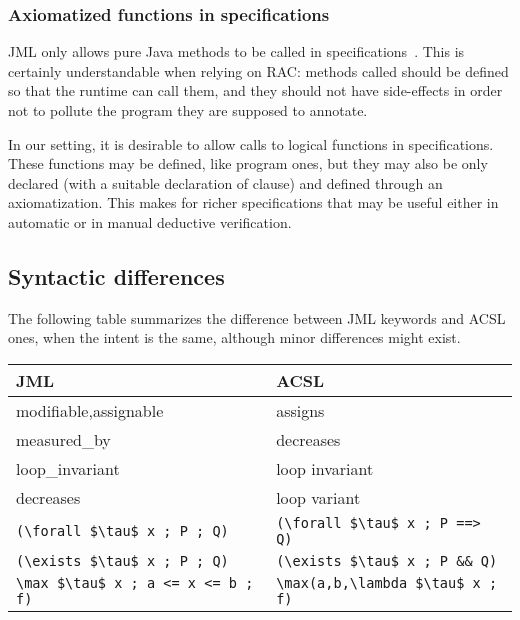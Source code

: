\subsubsection*{Axiomatized functions in specifications}

JML only allows pure Java methods to be called in
specifications~\cite{leavens00preliminary}. This is certainly
understandable when relying on RAC: methods called should be defined
so that the runtime can call them, and they should not have
side-effects in order not to pollute the program they are supposed to
annotate.

In our setting, it is desirable to allow calls to logical functions in
specifications. These functions may be defined, like program ones, but
they may also be only declared (with a suitable declaration of \reads
clause) and defined through an axiomatization.
This makes for richer specifications that may be useful either in
automatic or in manual deductive verification.

\subsection{Syntactic differences}

The following table summarizes the difference between JML keywords and
ACSL ones, when the intent is the same, although minor differences
might exist.
\begin{center}
\begin{tabular}{|l|l|}
\hline
  JML                  & ACSL \\ \hline
  modifiable,assignable           & assigns \\
  measured\_by         & decreases \\
  loop\_invariant      & loop invariant \\
  decreases            & loop variant \\
  \lstinline|(\forall $\tau$ x ; P ; Q)| &
       \lstinline|(\forall $\tau$ x ; P ==> Q)| \\
  \lstinline|(\exists $\tau$ x ; P ; Q)| &
        \lstinline|(\exists $\tau$ x ; P && Q)| \\
  \lstinline|\max $\tau$ x ; a <= x <= b ; f)| &
        \lstinline|\max(a,b,\lambda $\tau$ x ; f)| \\
  \hline
\end{tabular}
\end{center}





